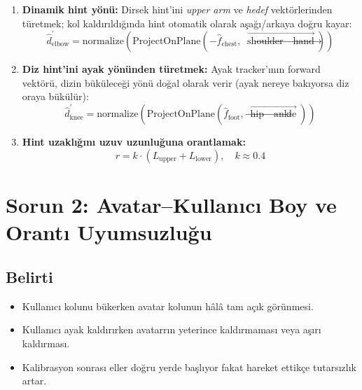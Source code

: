 \documentclass[11pt,a4paper]{article}
\begin{document}
\begin{enumerate}[nosep]
    \item \textbf{Dinamik hint y\"on\"u:} Dirsek hint'ini
          \textit{upper arm} ve \textit{hedef} vekt\"orlerinden
          t\"uretmek; kol kald{\i}r{\i}ld{\i}\u{g}{\i}nda hint otomatik olarak
          a\c{s}a\u{g}{\i}/arkaya do\u{g}ru kayar:
          \begin{equation}
              \hat{d}_{\text{elbow}}^{\prime} = \text{normalize}\!\left(
              \text{ProjectOnPlane}\!\left(-\hat{f}_{\text{chest}},\;
              \overrightarrow{\text{shoulder} \to \text{hand}}\right)\right)
              \label{eq:dynamic_elbow}
          \end{equation}

    \item \textbf{Diz hint'ini ayak y\"on\"unden t\"uretmek:}
          Ayak tracker'{\i}n{\i}n forward vekt\"or\"u, dizin b\"uk\"ulece\u{g}i y\"on\"u
          do\u{g}al olarak verir (ayak nereye bak{\i}yorsa diz oraya b\"uk\"ul\"ur):
          \begin{equation}
              \hat{d}_{\text{knee}}^{\prime} = \text{normalize}\!\left(
              \text{ProjectOnPlane}\!\left(\hat{f}_{\text{foot}},\;
              \overrightarrow{\text{hip} \to \text{ankle}}\right)\right)
              \label{eq:dynamic_knee}
          \end{equation}

    \item \textbf{Hint uzakl{\i}\u{g}{\i}n{\i} uzuv uzunlu\u{g}una orantlamak:}
          \begin{equation}
              r = k \cdot (L_{\text{upper}} + L_{\text{lower}}), \quad k \approx 0.4
              \label{eq:hint_dist}
          \end{equation}
\end{enumerate}

\section{Sorun 2: Avatar--Kullan{\i}c{\i} Boy ve Orant{\i} Uyumsuzlu\u{g}u}
\label{sec:boy}

\subsection{Belirti}

\begin{itemize}[nosep]
    \item Kullan{\i}c{\i} kolunu b\"ukerken avatar kolunun h\^al\^a tam
          a\c{c}{\i}k g\"or\"unmesi.
    \item Kullan{\i}c{\i} ayak kald{\i}r{\i}rken avatarr{\i}n yeterince
          kald{\i}rmamas{\i} veya a\c{s}{\i}r{\i} kald{\i}rmas{\i}.
    \item Kalibrasyon sonras{\i} eller do\u{g}ru yerde ba\c{s}l{\i}yor fakat
          hareket ettik\c{c}e tutars{\i}zl{\i}k artar.
\end{itemize}
\end{document}
